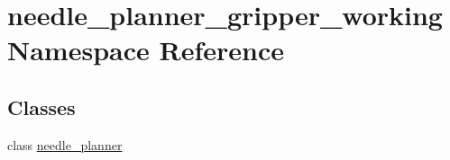 \hypertarget{namespaceneedle__planner__gripper__working}{}\section{needle\+\_\+planner\+\_\+gripper\+\_\+working Namespace Reference}
\label{namespaceneedle__planner__gripper__working}
\subsection*{Classes}
\begin{DoxyCompactItemize}
\item 
class \hyperlink{classneedle__planner__gripper__working_1_1needle__planner}{needle\+\_\+planner}
\end{DoxyCompactItemize}
